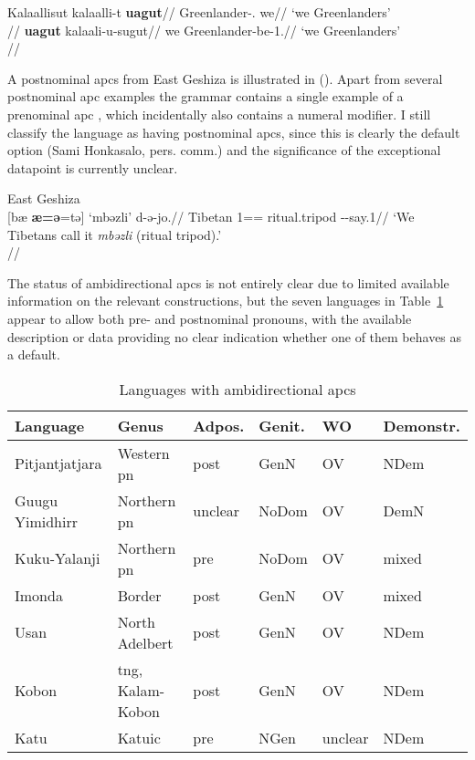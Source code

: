 \documentclass[A4paper]{article}
\begin{document}
\pex Kalaallisut
\a
\begingl
\gla kalaalli-t \textbf{uagut}//
\glb Greenlander-\Abs{}.\Pl{} we//
\glft `we Greenlanders'\\{\citep[after][110; gloss extrapolated]{fortescue1984}}//
\endgl
\a
\begingl
\gla \textbf{uagut} kalaali-u-sugut//
\glb we Greenlander-be-1\Pl{}.\Ptcp{}//
\glft `we Greenlanders' \\{\citep[after][257]{fortescue1984}}//
\endgl
\xe

A postnominal \glspl{apc} from East Geshiza is illustrated in (\nextx). Apart from several postnominal \gls{apc} examples the grammar contains a single example of a prenominal \gls{apc} \citep[388, (5.74)]{honkasalo2019}, which incidentally also contains a numeral modifier. I still classify the language as having postnominal \glspl{apc}, since this is clearly the default option (Sami Honkasalo, pers. comm.) and the significance of the exceptional datapoint is currently unclear.
 
\ex East Geshiza\\
\begingl
\gla {}[b\ae{} \textbf{\ng\ae{}=\textltailn{}ə}=tə] `mbəzli' d-ə-jo\ng{}.//
\glb \phantom{[}Tibetan 1=\Pl{}=\Top{} ritual.tripod \Pref{}-\Nact{}-say.1//
\glft `We Tibetans call it \emph{mbəzli} (ritual tripod).'\\
\citep[400, 5.115]{honkasalo2019}\label{ex:geshizappdc}//
\endgl
\xe


The status of ambidirectional \glspl{apc} is not entirely clear due to limited available information on the relevant constructions, but the seven languages in Table~\ref{table:ambiAPC} appear to allow both pre- and postnominal pronouns, with the available description or data providing no clear indication whether one of them behaves as a default. 

\begin{table}[htb!]
\centering
\caption{Languages with ambidirectional \glspl{apc}\label{table:ambiAPC}}
\begin{tabular}{llllll}
\textbf{Language} & \textbf{Genus}      &  \textbf{Adpos.} & \textbf{Genit.} & \textbf{WO} & \textbf{Demonstr.}   \\
  \midrule
Pitjantjatjara 	& Western \gls{pn} 	& post 		& GenN 	& OV 		& NDem \\ 
Guugu Yimidhirr & Northern \gls{pn} 	& unclear 	& NoDom & OV 		& DemN \\ 
Kuku-Yalanji 	& Northern \gls{pn}	& pre 		& NoDom & OV 		& mixed \\ 
Imonda 		& Border 		& post 		& GenN 	& OV 		& mixed \\ 
Usan 		& North Adelbert 	& post 		& GenN 	& OV 		& NDem \\ 
Kobon 		& \gls{tng}, Kalam-Kobon & post 	& GenN 	& OV 		& NDem \\ 
Katu 		& Katuic 		& pre 		& NGen 	& unclear 	& NDem \\ 

\end{tabular}
\end{table}
\end{document}
